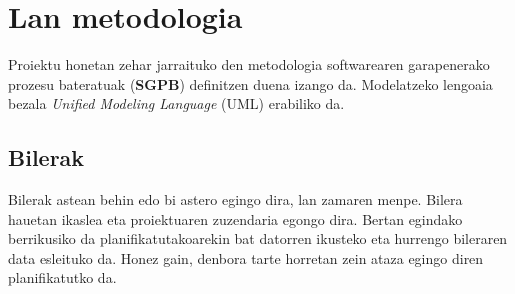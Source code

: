 \section{Lan metodologia}
Proiektu honetan zehar jarraituko den metodologia softwarearen garapenerako prozesu bateratuak (\textbf{SGPB}) definitzen duena izango da. Modelatzeko lengoaia bezala \textit{Unified Modeling Language} (UML) erabiliko da.
\subsection{Bilerak}
Bilerak astean behin edo bi astero egingo dira, lan zamaren menpe. Bilera hauetan ikaslea eta proiektuaren zuzendaria egongo dira. Bertan egindako berrikusiko da planifikatutakoarekin bat datorren ikusteko eta hurrengo bileraren data esleituko da. Honez gain, denbora tarte horretan zein ataza egingo diren planifikatutko da.
